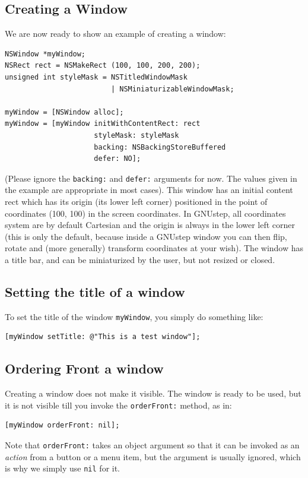 \documentclass[a4paper]{article}
\begin{document}
\subsection{Creating a Window}
We are now ready to show an example of creating a window: 
\begin{verbatim}
NSWindow *myWindow;
NSRect rect = NSMakeRect (100, 100, 200, 200);
unsigned int styleMask = NSTitledWindowMask 
                         | NSMiniaturizableWindowMask;

myWindow = [NSWindow alloc];
myWindow = [myWindow initWithContentRect: rect
                     styleMask: styleMask
                     backing: NSBackingStoreBuffered
                     defer: NO];
\end{verbatim}
(Please ignore the \texttt{backing:} and \texttt{defer:} arguments for
now.  The values given in the example are appropriate in most cases).
This window has an initial content rect which has its origin (its
lower left corner) positioned in the point of coordinates (100, 100)
in the screen coordinates.  In GNUstep, all coordinates system are by
default Cartesian and the origin is always in the lower left corner
(this is only the default, because inside a GNUstep window you can
then flip, rotate and (more generally) transform coordinates at your
wish).  The window has a title bar, and can be miniaturized by the
user, but not resized or closed.

\subsection{Setting the title of a window}
To set the title of the window \texttt{myWindow}, you simply do
something like:
\begin{verbatim}
[myWindow setTitle: @"This is a test window"];
\end{verbatim}

\subsection{Ordering Front a window}
Creating a window does not make it visible.  The window is ready to be
used, but it is not visible till you invoke the \texttt{orderFront:}
method, as in:
\begin{verbatim}
[myWindow orderFront: nil];
\end{verbatim}
Note that \texttt{orderFront:} takes an object argument so that it can
be invoked as an \emph{action} from a button or a menu item, but the
argument is usually ignored, which is why we simply use \texttt{nil}
for it.
\end{document}
